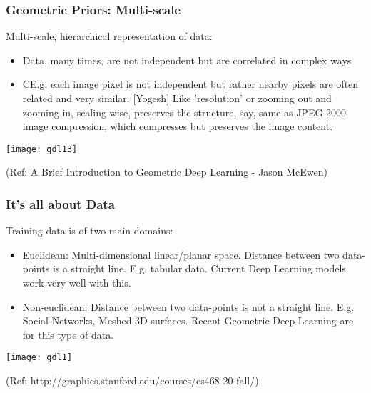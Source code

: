 \begin{frame}[fragile]\frametitle{Geometric Priors: Multi-scale}

Multi-scale, hierarchical representation of data:

\begin{itemize}
\item Data, many times, are not independent but are correlated in complex ways
\item CE.g. each image pixel is not independent but rather nearby pixels are often related and very similar. [Yogesh] Like 'resolution' or zooming out and zooming in, scaling wise, preserves the structure, say, same as  JPEG-2000 image compression, which compresses but preserves the image content.
\end{itemize}

\begin{center}
\texttt{[image: gdl13]}
\end{center}

{\tiny (Ref: A Brief Introduction to Geometric Deep Learning - Jason McEwen)}

\end{frame}



\begin{frame}[fragile]\frametitle{It's all about Data}

Training data is of two main domains:
\begin{itemize}
\item Euclidean: Multi-dimensional linear/planar space. Distance between two data-points is a straight line. E.g. tabular data. Current Deep Learning models work very well with this.
\item Non-euclidean: Distance between two data-points is not a straight line. E.g. Social Networks, Meshed 3D surfaces. Recent Geometric Deep Learning are for this type of data.
\end{itemize}
	  
\begin{center}
\texttt{[image: gdl1]}
\end{center}

{\tiny (Ref: http://graphics.stanford.edu/courses/cs468-20-fall/)}

\end{frame}


